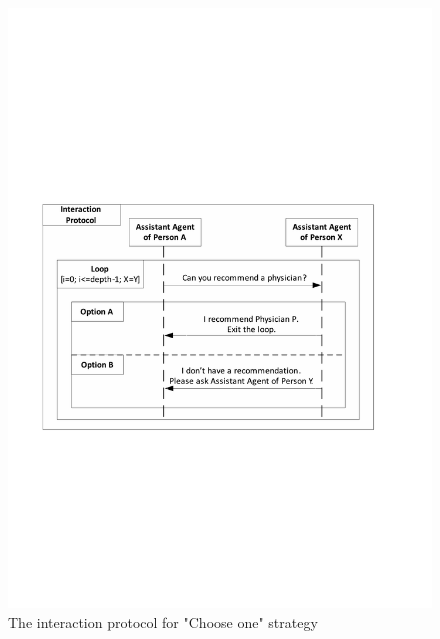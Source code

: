 \begin{figure}
\centering
\includegraphics[scale=0.7]{chap3/chap3-fprotocol.pdf}
\caption{The interaction protocol for "Choose one" strategy}
\label{ch3:fprotocol}
\end{figure}

